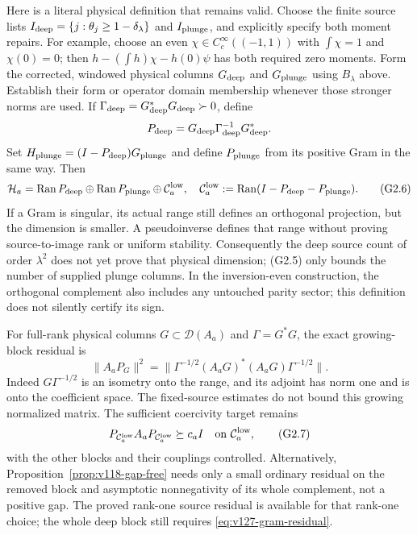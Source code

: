 \documentclass[11pt]{article}
\theoremstyle{remark}
\begin{document}
Here is a literal physical definition that remains valid. Choose the
finite source lists $I_{\rm deep}=\{j:\theta_j\ge1-\delta_\lambda\}$
and $I_{\rm plunge}$, and explicitly specify both moment repairs.
For example, choose an even $\chi\in C_c^\infty((-1,1))$ with
$\int\chi=1$ and $\chi(0)=0$; then
$h-(\int h)\chi-h(0)\psi$ has both required zero moments.
Form the corrected, windowed physical columns $G_{\rm deep}$ and
$G_{\rm plunge}$ using $B_\lambda$ above. Establish their form or
operator domain membership whenever those stronger norms are used.
If $\Gamma_{\rm deep}=G_{\rm deep}^*G_{\rm deep}\succ0$, define
\[
 P_{\rm deep}=G_{\rm deep}\Gamma_{\rm deep}^{-1}G_{\rm deep}^*.
\]
Set $H_{\rm plunge}=(I-P_{\rm deep})G_{\rm plunge}$ and define
$P_{\rm plunge}$ from its positive Gram in the same way. Then
\[
 \mathcal H_a=\operatorname{Ran}P_{\rm deep}\oplus
 \operatorname{Ran}P_{\rm plunge}\oplus\mathcal C_a^{\rm low},
 \quad
 \mathcal C_a^{\rm low}:=\operatorname{Ran}(I-P_{\rm deep}-P_{\rm plunge}).
 \tag{G2.6}
\]
If a Gram is singular, its actual range still defines an orthogonal
projection, but the dimension is smaller. A pseudoinverse defines that
range without proving source-to-image rank or uniform stability.
Consequently the deep source count of order $\lambda^2$ does not yet
prove that physical dimension; (G2.5) only bounds the number of supplied
plunge columns. In the inversion-even construction, the orthogonal
complement also includes any untouched parity sector; this definition
does not silently certify its sign.

For full-rank physical columns $G\subset\mathcal D(A_a)$ and
$\Gamma=G^*G$, the exact growing-block residual is
\begin{equation}\label{eq:v127-gram-residual}
 \|A_aP_G\|^2
 =\|\Gamma^{-1/2}(A_aG)^*(A_aG)\Gamma^{-1/2}\|.
\end{equation}
Indeed $G\Gamma^{-1/2}$ is an isometry onto the range, and its
adjoint has norm one and is onto the coefficient space. The
fixed-source estimates do not bound this growing normalized matrix.
The sufficient coercivity target remains
\[
 P_{\mathcal C_a^{\rm low}}A_aP_{\mathcal C_a^{\rm low}}\succeq c_a I
 \quad\hbox{on }\mathcal C_a^{\rm low},
 \tag{G2.7}
\]
with the other blocks and their couplings controlled. Alternatively,
Proposition~\ref{prop:v118-gap-free} needs only a small ordinary
residual on the removed block and asymptotic nonnegativity of its
whole complement, not a positive gap. The proved rank-one source
residual is available for that rank-one choice; the whole deep block
still requires \eqref{eq:v127-gram-residual}.
\end{document}
